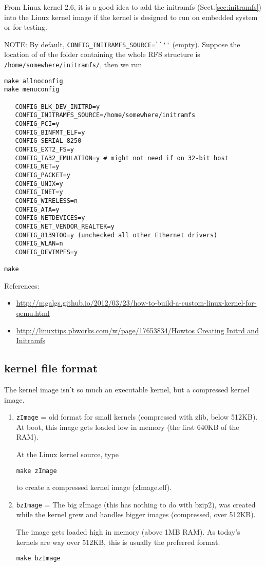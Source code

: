 From Linux kernel 2.6, it is a good idea to add the initramfs
(Sect.\ref{sec:initramfs}) into the Linux kernel image if the kernel is designed
to run on embedded system or for testing.

NOTE: By default, \verb!CONFIG_INITRAMFS_SOURCE=``''! (empty).
Suppose the location of of the folder containing the whole RFS structure is
\verb!/home/somewhere/initramfs/!, then we run

\begin{verbatim}
make allnoconfig
make menuconfig

   CONFIG_BLK_DEV_INITRD=y
   CONFIG_INITRAMFS_SOURCE=/home/somewhere/initramfs
   CONFIG_PCI=y
   CONFIG_BINFMT_ELF=y
   CONFIG_SERIAL_8250
   CONFIG_EXT2_FS=y
   CONFIG_IA32_EMULATION=y # might not need if on 32-bit host
   CONFIG_NET=y
   CONFIG_PACKET=y
   CONFIG_UNIX=y
   CONFIG_INET=y
   CONFIG_WIRELESS=n
   CONFIG_ATA=y
   CONFIG_NETDEVICES=y
   CONFIG_NET_VENDOR_REALTEK=y
   CONFIG_8139TOO=y (unchecked all other Ethernet drivers)
   CONFIG_WLAN=n
   CONFIG_DEVTMPFS=y

make
\end{verbatim}

References:
\begin{itemize}
  \item 
\url{http://mgalgs.github.io/2012/03/23/how-to-build-a-custom-linux-kernel-for-qemu.html}

   \item
   \url{http://linuxtips.pbworks.com/w/page/17653834/Howtos Creating Initrd and Initramfs}
\end{itemize}

\subsection{kernel file format}
\label{sec:compressed-kernel-file-format}

The kernel image isn't so much an executable kernel, but a compressed kernel
image.
\begin{enumerate}
  \item \verb!zImage! = old format for small kernels (compressed with zlib,
  below 512KB). At boot, this image gets loaded low in memory (the first 640KB
  of the RAM).

At the Linux kernel source, type
\begin{verbatim}
make zImage
\end{verbatim}  
to create a compressed kernel image (zImage.elf).

  \item \verb!bzImage! = The big zImage (this has nothing to do with bzip2), was
  created while the kernel grew and handles bigger images (compressed, over
  512KB). 
  
  The image gets loaded high in memory (above 1MB RAM). As today's
  kernels are way over 512KB, this is usually the preferred format.

\begin{verbatim}
make bzImage
\end{verbatim}  

\end{enumerate}

